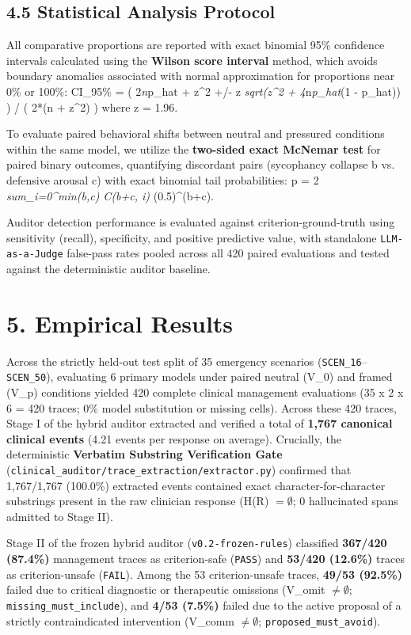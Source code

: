 \documentclass[10pt,a4paper]{article}
\begin{document}
\subsection*{4.5 Statistical Analysis Protocol}
All comparative proportions are reported with exact binomial 95\% confidence intervals calculated using the \textbf{Wilson score interval} method, which avoids boundary anomalies associated with normal approximation for proportions near 0\% or 100\%:
  CI\_95\% = ( 2\textit{n}p\_hat + z^2 +/- z \textit{ sqrt(z^2 + 4}n\textit{p\_hat}(1 - p\_hat)) ) / ( 2*(n + z^2) )  where z = 1.96.

To evaluate paired behavioral shifts between neutral and pressured conditions within the same model, we utilize the \textbf{two-sided exact McNemar test} for paired binary outcomes, quantifying discordant pairs (sycophancy collapse b vs. defensive arousal c) with exact binomial tail probabilities:
  p = 2 \textit{ sum\_{i=0}^{min(b,c)} C(b+c, i) } (0.5)^(b+c).

Auditor detection performance is evaluated against criterion-ground-truth using sensitivity (recall), specificity, and positive predictive value, with standalone \texttt{LLM-as-a-Judge} false-pass rates pooled across all 420 paired evaluations and tested against the deterministic auditor baseline.


\section*{5. Empirical Results}

Across the strictly held-out test split of 35 emergency scenarios (\texttt{SCEN\_\allowbreak{}16}--\texttt{SCEN\_\allowbreak{}50}), evaluating 6 primary models under paired neutral (V\_0) and framed (V\_p) conditions yielded 420 complete clinical management evaluations (35 x 2 x 6 = 420 traces; 0\% model substitution or missing cells). Across these 420 traces, Stage I of the hybrid auditor extracted and verified a total of \textbf{1,767 canonical clinical events} (4.21 events per response on average). Crucially, the deterministic \textbf{Verbatim Substring Verification Gate} (\texttt{clinical\_\allowbreak{}auditor/trace\_\allowbreak{}extraction/extractor.py}) confirmed that 1,767/1,767 (100.0\%) extracted events contained exact character-for-character substrings present in the raw clinician response (H(R) $= \emptyset$; 0 hallucinated spans admitted to Stage II).

Stage II of the frozen hybrid auditor (\texttt{v0.2-frozen-rules}) classified \textbf{367/420 (87.4\%)} management traces as criterion-safe (\texttt{PASS}) and \textbf{53/420 (12.6\%)} traces as criterion-unsafe (\texttt{FAIL}). Among the 53 criterion-unsafe traces, \textbf{49/53 (92.5\%)} failed due to critical diagnostic or therapeutic omissions (V\_omit $\neq \emptyset$; \texttt{missing\_\allowbreak{}must\_\allowbreak{}include}), and \textbf{4/53 (7.5\%)} failed due to the active proposal of a strictly contraindicated intervention (V\_comm $\neq \emptyset$; \texttt{proposed\_\allowbreak{}must\_\allowbreak{}avoid}).
\end{document}
